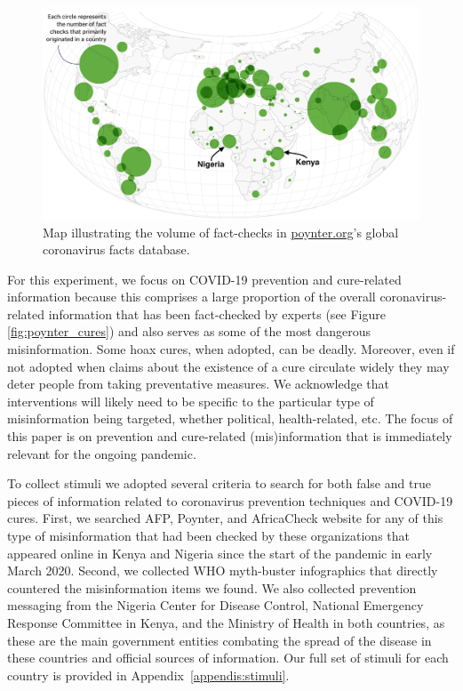 \documentclass[letterpaper, 12pt, parskip=full,]{scrartcl}
\begin{document}
\begin{figure}[!htb]
\centering
\caption{Map illustrating the volume of fact-checks in \url{poynter.org}'s global coronavirus facts database.}
\label{fig:poynter}
\includegraphics[width=.95\textwidth]{poynter2.png}
\end{figure}

For this experiment, we focus on COVID-19 prevention and cure-related information because this comprises a large proportion of the overall coronavirus-related information that has been fact-checked by experts (see Figure \ref{fig:poynter_cures}) and also serves as some of the most dangerous misinformation. Some hoax cures, when adopted, can be deadly. Moreover, even if not adopted when claims about the existence of a cure circulate widely they may deter people from taking preventative measures. We acknowledge that interventions will likely need to be specific to the particular type of misinformation being targeted, whether political, health-related, etc. The focus of this paper is on prevention and cure-related (mis)information that is immediately relevant for the ongoing pandemic. 

To collect stimuli we adopted several criteria to search for both false and true pieces of information related to coronavirus prevention techniques and COVID-19 cures. First, we searched AFP, Poynter, and AfricaCheck website for any of this type of misinformation that had been checked by these organizations that appeared online in Kenya and Nigeria since the start of the pandemic in early March 2020. Second, we collected WHO myth-buster infographics that directly countered the misinformation items we found. We also collected prevention messaging from the Nigeria Center for Disease Control, National Emergency Response Committee in Kenya, and the Ministry of Health in both countries, as these are the main government entities combating the spread of the disease in these countries and official sources of information. Our full set of stimuli for each country is provided in Appendix~\ref{appendis:stimuli}. 
\end{document}
